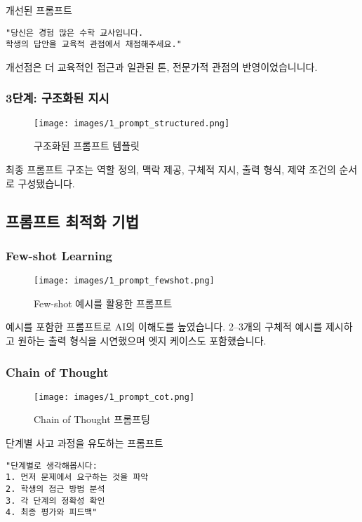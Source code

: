 개선된 프롬프트
\begin{verbatim}
"당신은 경험 많은 수학 교사입니다. 
학생의 답안을 교육적 관점에서 채점해주세요."
\end{verbatim}

개선점은 더 교육적인 접근과 일관된 톤, 전문가적 관점의 반영이었습니니다.

\subsubsection{3단계: 구조화된 지시}

\begin{figure}[H]
    \centering
    \texttt{[image: images/1\_prompt\_structured.png]}
    \caption{구조화된 프롬프트 템플릿}
    \label{fig:prompt_structured}
\end{figure}

최종 프롬프트 구조는 역할 정의, 맥락 제공, 구체적 지시, 출력 형식, 제약 조건의 순서로 구성됐습니다.

\subsection{프롬프트 최적화 기법}

\subsubsection{Few-shot Learning}

\begin{figure}[H]
    \centering
    \texttt{[image: images/1\_prompt\_fewshot.png]}
    \caption{Few-shot 예시를 활용한 프롬프트}
    \label{fig:prompt_fewshot}
\end{figure}

예시를 포함한 프롬프트로 AI의 이해도를 높였습니다. 2–3개의 구체적 예시를 제시하고 원하는 출력 형식을 시연했으며 엣지 케이스도 포함했습니다.

\subsubsection{Chain of Thought}

\begin{figure}[H]
    \centering
    \texttt{[image: images/1\_prompt\_cot.png]}
    \caption{Chain of Thought 프롬프팅}
    \label{fig:prompt_cot}
\end{figure}

단계별 사고 과정을 유도하는 프롬프트
\begin{verbatim}
"단계별로 생각해봅시다:
1. 먼저 문제에서 요구하는 것을 파악
2. 학생의 접근 방법 분석
3. 각 단계의 정확성 확인
4. 최종 평가와 피드백"
\end{verbatim}

